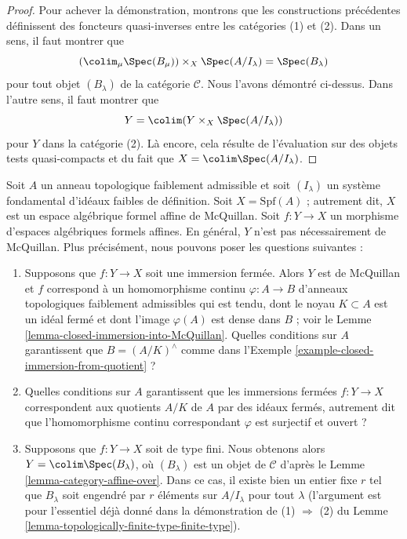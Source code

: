 \begin{proof}
\medskip\noindent
Pour achever la démonstration, montrons que les constructions précédentes
définissent des foncteurs quasi-inverses entre les catégories (1) et (2).
Dans un sens, il faut montrer que
$$
\left(\colim_\mu \Spec(B_\mu)\right) \times_X \Spec(A/I_\lambda) =
\Spec(B_\lambda)
$$
pour tout objet $(B_\lambda)$ de la catégorie $\mathcal{C}$.
Nous l'avons démontré ci-dessus. Dans
l'autre sens, il faut montrer que
$$
Y = \colim (Y \times_X \Spec(A/I_\lambda))
$$
pour $Y$ dans la catégorie (2). Là encore, cela résulte de l'évaluation sur des
objets tests quasi-compacts et du fait que $X = \colim \Spec(A/I_\lambda)$.
\end{proof}

\begin{remark}
\label{remark-questions}
Soit $A$ un anneau topologique faiblement admissible et soit $(I_\lambda)$
un système fondamental d'idéaux faibles de définition. Soit $X = \text{Spf}(A)$ ;
autrement dit, $X$ est un espace algébrique formel affine de McQuillan.
Soit $f : Y \to X$ un morphisme d'espaces algébriques formels affines.
En général, $Y$ n'est pas nécessairement de McQuillan. Plus précisément,
nous pouvons poser les questions suivantes :
\begin{enumerate}
\item Supposons que $f : Y \to X$ soit une immersion fermée. Alors
$Y$ est de McQuillan et $f$ correspond à un homomorphisme continu
$\varphi : A \to B$ d'anneaux topologiques faiblement admissibles
qui est tendu, dont le noyau $K \subset A$ est un idéal fermé et
dont l'image $\varphi(A)$ est dense dans $B$ ; voir le
Lemme \ref{lemma-closed-immersion-into-McQuillan}.
Quelles conditions sur $A$ garantissent que $B = (A/K)^\wedge$ comme dans
l'Exemple \ref{example-closed-immersion-from-quotient} ?
\item Quelles conditions sur $A$ garantissent que les immersions fermées
$f : Y \to X$ correspondent aux quotients $A/K$ de $A$ par des idéaux fermés,
autrement dit que l'homomorphisme continu correspondant $\varphi$ est surjectif
et ouvert ?
\item Supposons que $f : Y \to X$ soit de type fini. Nous obtenons alors
$Y = \colim \Spec(B_\lambda)$, où $(B_\lambda)$ est un objet de
$\mathcal{C}$ d'après le Lemme \ref{lemma-category-affine-over}.
Dans ce cas, il existe bien un entier fixe $r$ tel
que $B_\lambda$ soit engendré par $r$ éléments sur $A/I_\lambda$ pour
tout $\lambda$ (l'argument est pour l'essentiel déjà donné dans la démonstration de
(1) $\Rightarrow$ (2) du
Lemme \ref{lemma-topologically-finite-type-finite-type}).

\end{enumerate}
\end{remark}
